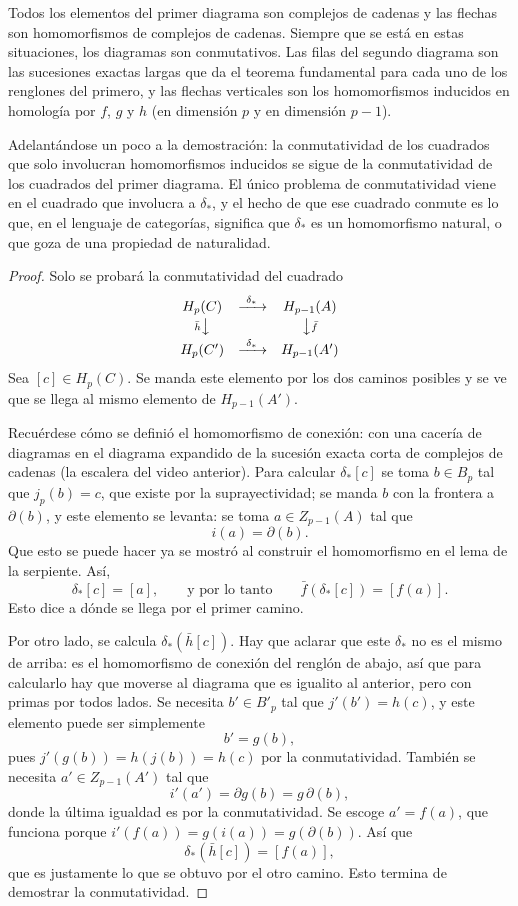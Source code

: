 \documentclass[11pt]{article}
\begin{document}
Todos los elementos del primer diagrama son complejos de cadenas y las flechas son homomorfismos de complejos de cadenas. Siempre que se está en estas situaciones, los diagramas son conmutativos. Las filas del segundo diagrama son las sucesiones exactas largas que da el teorema fundamental para cada uno de los renglones del primero, y las flechas verticales son los homomorfismos inducidos en homología por $f$, $g$ y $h$ (en dimensión $p$ y en dimensión $p-1$).

Adelantándose un poco a la demostración: la conmutatividad de los cuadrados que solo involucran homomorfismos inducidos se sigue de la conmutatividad de los cuadrados del primer diagrama. El único problema de conmutatividad viene en el cuadrado que involucra a $\delta_*$, y el hecho de que ese cuadrado conmute es lo que, en el lenguaje de categorías, significa que $\delta_*$ es un homomorfismo natural, o que goza de una propiedad de naturalidad.

\begin{proof}
Solo se probará la conmutatividad del cuadrado
\[
  \begin{array}{ccc}
    H_p(C) & \xrightarrow{\ \delta_*\ } & H_{p-1}(A)\\[2pt]
    {\scriptstyle\bar h}\big\downarrow & & \big\downarrow{\scriptstyle\bar f}\\[2pt]
    H_p(C') & \xrightarrow{\ \delta_*\ } & H_{p-1}(A')
  \end{array}
\]
Sea $[c]\in H_p(C)$. Se manda este elemento por los dos caminos posibles y se ve que se llega al mismo elemento de $H_{p-1}(A')$.

Recuérdese cómo se definió el homomorfismo de conexión: con una cacería de diagramas en el diagrama expandido de la sucesión exacta corta de complejos de cadenas (la escalera del video anterior). Para calcular $\delta_*[c]$ se toma $b\in B_p$ tal que $j_p(b)=c$, que existe por la suprayectividad; se manda $b$ con la frontera a $\partial(b)$, y este elemento se levanta: se toma $a\in Z_{p-1}(A)$ tal que
\[
  i(a)=\partial(b).
\]
Que esto se puede hacer ya se mostró al construir el homomorfismo en el lema de la serpiente. Así,
\[
  \delta_*[c]=[a],\qquad\text{y por lo tanto}\qquad\bar f(\delta_*[c])=[f(a)].
\]
Esto dice a dónde se llega por el primer camino.

Por otro lado, se calcula $\delta_*(\bar h[c])$. Hay que aclarar que este $\delta_*$ no es el mismo de arriba: es el homomorfismo de conexión del renglón de abajo, así que para calcularlo hay que moverse al diagrama que es igualito al anterior, pero con primas por todos lados. Se necesita $b'\in B'_p$ tal que $j'(b')=h(c)$, y este elemento puede ser simplemente
\[
  b'=g(b),
\]
pues $j'(g(b))=h(j(b))=h(c)$ por la conmutatividad. También se necesita $a'\in Z_{p-1}(A')$ tal que
\[
  i'(a')=\partial g(b)=g\,\partial(b),
\]
donde la última igualdad es por la conmutatividad. Se escoge $a'=f(a)$, que funciona porque $i'(f(a))=g(i(a))=g(\partial(b))$. Así que
\[
  \delta_*(\bar h[c])=[f(a)],
\]
que es justamente lo que se obtuvo por el otro camino. Esto termina de demostrar la conmutatividad.
\end{proof}
\end{document}
